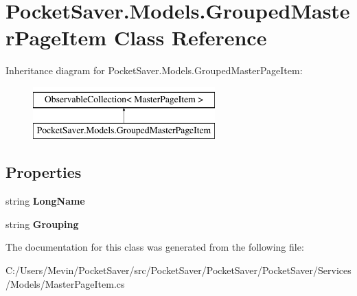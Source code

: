 \hypertarget{class_pocket_saver_1_1_models_1_1_grouped_master_page_item}{}\section{Pocket\+Saver.\+Models.\+Grouped\+Master\+Page\+Item Class Reference}
\label{class_pocket_saver_1_1_models_1_1_grouped_master_page_item}
Inheritance diagram for Pocket\+Saver.\+Models.\+Grouped\+Master\+Page\+Item\+:\begin{figure}[H]
\begin{center}
\leavevmode
\includegraphics[height=2.000000cm]{class_pocket_saver_1_1_models_1_1_grouped_master_page_item}
\end{center}
\end{figure}
\subsection*{Properties}
\begin{DoxyCompactItemize}
\item 
\mbox{\label{class_pocket_saver_1_1_models_1_1_grouped_master_page_item_a619204fd7ed3f9066387189fae76a98d}} 
string {\bfseries Long\+Name}
\item 
\mbox{\label{class_pocket_saver_1_1_models_1_1_grouped_master_page_item_a696caaaeb0bff26534f64905fa6e61be}} 
string {\bfseries Grouping}
\end{DoxyCompactItemize}


The documentation for this class was generated from the following file\+:\begin{DoxyCompactItemize}
\item 
C\+:/\+Users/\+Mevin/\+Pocket\+Saver/src/\+Pocket\+Saver/\+Pocket\+Saver/\+Pocket\+Saver/\+Services/\+Models/Master\+Page\+Item.\+cs\end{DoxyCompactItemize}
